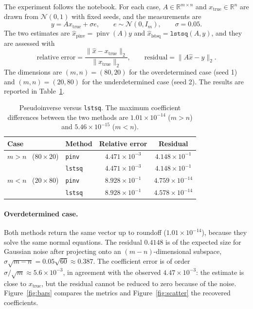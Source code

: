 \documentclass[11pt,a4paper]{article}
\newcommand{\R}{\mathbb{R}}
\begin{document}
The experiment follows the notebook. For each case, $A\in\R^{m\times n}$ and
$x_{\text{true}}\in\R^n$ are drawn from $\mathcal{N}(0,1)$ with fixed seeds, and the measurements
are
\[
y=Ax_{\text{true}}+\sigma e,\qquad e\sim\mathcal{N}(0,I_m),\qquad \sigma=0.05 .
\]
The two estimates are $\hat{x}_{\text{pinv}}=\operatorname{pinv}(A)y$ and
$\hat{x}_{\text{lstsq}}=\texttt{lstsq}(A,y)$, and they are assessed with
\begin{equation}
\text{relative error}=\frac{\|\hat{x}-x_{\text{true}}\|_2}{\|x_{\text{true}}\|_2},
\qquad
\text{residual}=\|A\hat{x}-y\|_2 .
\label{eq:metrics}
\end{equation}
The dimensions are $(m,n)=(80,20)$ for the overdetermined case (seed 1) and $(m,n)=(20,80)$ for
the underdetermined case (seed 2). The results are reported in Table~\ref{tab:pinv}.

\begin{table}[H]
\centering
\small
\begin{tabular}{llcc}
\toprule
Case & Method & Relative error & Residual\\
\midrule
$m>n$ \ ($80\times20$) & \texttt{pinv}  & $4.471\times10^{-3}$ & $4.148\times10^{-1}$\\
                       & \texttt{lstsq} & $4.471\times10^{-3}$ & $4.148\times10^{-1}$\\
\addlinespace
$m<n$ \ ($20\times80$) & \texttt{pinv}  & $8.928\times10^{-1}$ & $4.759\times10^{-14}$\\
                       & \texttt{lstsq} & $8.928\times10^{-1}$ & $4.578\times10^{-14}$\\
\bottomrule
\end{tabular}
\caption{Pseudoinverse versus \texttt{lstsq}. The maximum coefficient differences between the two
methods are $1.01\times10^{-14}$ ($m>n$) and $5.46\times10^{-15}$ ($m<n$).}
\label{tab:pinv}
\end{table}

\paragraph{Overdetermined case.}
Both methods return the same vector up to roundoff ($1.01\times10^{-14}$), because they solve the
same normal equations. The residual $0.4148$ is of the expected size for Gaussian noise after
projecting onto an $(m-n)$-dimensional subspace, $\sigma\sqrt{m-n}=0.05\sqrt{60}\approx0.387$.
The coefficient error is of order $\sigma/\sqrt{m}\approx5.6\times10^{-3}$, in agreement with the
observed $4.47\times10^{-3}$: the estimate is close to $x_{\text{true}}$, but the residual cannot
be reduced to zero because of the noise. Figure~\ref{fig:bars} compares the metrics and
Figure~\ref{fig:scatter} the recovered coefficients.
\end{document}
